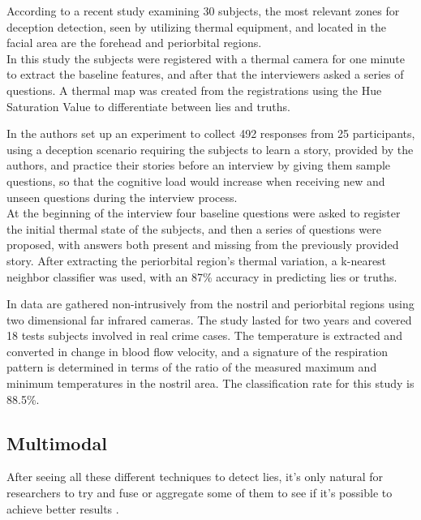 According to a recent study \cite{Abouelenien:2015:TAD:2823465.2823470} examining 30 subjects, the most relevant zones for deception detection, seen by utilizing thermal equipment, and located in the facial area are the forehead and periorbital regions. \\
In this study the subjects were registered with a thermal camera for one minute to extract the baseline features, and after that the interviewers asked a series of questions. A thermal map was created from the registrations using the Hue Saturation Value to differentiate between lies and truths.

In \cite{Rajoub} the authors set up an experiment to collect 492 responses from 25 participants, using a deception scenario requiring the subjects to learn a story, provided by the authors, and practice their stories before an interview by giving them sample questions, so that the cognitive load would increase when receiving new and unseen questions during the interview process.\\ 
At the beginning of the interview four baseline questions were asked to register the initial thermal state of the subjects, and then a series of questions were proposed, with answers both present and missing from the previously provided story. After extracting the periorbital region's thermal variation, a k-nearest neighbor classifier was used, with an 87\% accuracy in predicting lies or truths.

In \cite{6967765} data are gathered non-intrusively from the nostril and periorbital regions using two dimensional far infrared cameras. The study lasted for two years and covered 18 tests subjects involved in real crime cases. The temperature is extracted and converted in change in blood flow velocity, and a signature of the respiration pattern is determined in terms of the ratio of the measured maximum and minimum temperatures in the nostril area. The classification rate for this study is 88.5\%.

\subsection{Multimodal}
After seeing all these different techniques to detect lies, it's only natural for researchers to try and fuse or aggregate some of them to see if it's possible to achieve better results \cite{Abouelenien:2014:DDU:2663204.2663229}.

